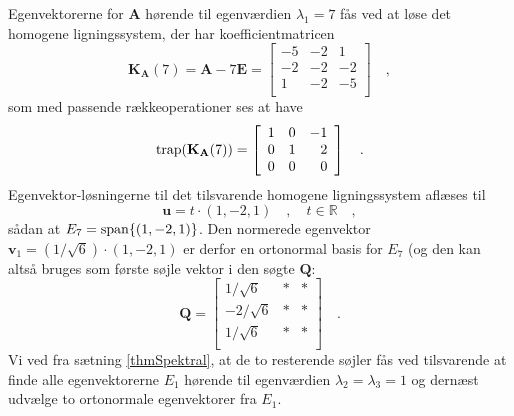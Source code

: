 \begin{example}
Egenvektorerne for $\mathbf{A}$ hørende til egenværdien $\lambda_{1} = 7$ fås ved at løse det homogene ligningssystem, der har koefficientmatricen
\begin{equation}
\mathbf{K}_{\mathbf{A}}(7) = \mathbf{A} - 7\mathbf{E} = \left[
                                          \begin{array}{rrr}
                                            -5 &  -2 & 1 \\
                                            -2 & -2 & -2 \\
                                            1 & -2& -5 \\
                                          \end{array}
                                        \right] \quad ,
\end{equation}
som med passende rækkeoperationer ses at have
\begin{equation}
\mathrm{trap}(\mathbf{K}_{\mathbf{A}}(7)) = \left[
                                          \begin{array}{rrr}
                                            1 &  0 & -1 \\
                                            0 & 1 & 2 \\
                                            0 & 0& 0 \\
                                          \end{array}
                                        \right] \quad .
\end{equation}
Egenvektor-løsningerne til det tilsvarende homogene ligningssystem aflæses til
\begin{equation}
\mathbf{u} = t \cdot (1, -2, 1) \quad , \quad t \in \mathbb{R} \quad ,
\end{equation}
sådan at $E_{7}= \mathrm{span}\{(1,-2,1)\}$. Den normerede egenvektor $\mathbf{v}_{1} = (1/\sqrt{6})\cdot (1, -2, 1)$ er derfor en ortonormal basis for $E_{7}$ (og den kan altså bruges som første søjle vektor i den søgte $\mathbf{Q}$:
\begin{equation}
\mathbf{Q}= \left[
          \begin{array}{rrr}
            1/\sqrt{6} & * & * \\
            -2/\sqrt{6} & * & * \\
            1/\sqrt{6} & * & * \\
          \end{array}
        \right] \quad .
\end{equation}
Vi ved fra sætning \ref{thmSpektral}, at de to resterende søjler fås ved tilsvarende at finde alle egenvektorerne $E_{1}$  hørende til egenværdien $\lambda_{2} = \lambda_{3} = 1$ og dernæst udvælge to ortonormale egenvektorer fra $E_{1}$. \\


\end{example}
